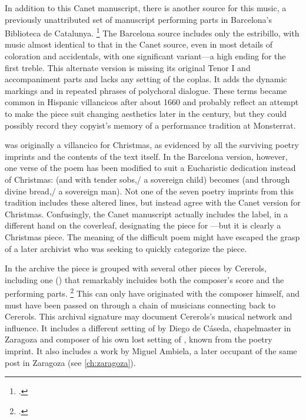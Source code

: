 In addition to this Canet manuscript, there is another source for this music, a
previously unattributed set of manuscript performing parts in Barcelona's
Biblioteca de Catalunya.%
    \footnote{.}
The Barcelona source includes only the estribillo, with music almost identical
to that in the Canet source, even in most details of coloration and accidentals,
with one significant variant---a  high ending for the first treble.
This alternate version is missing its original Tenor I and accompaniment parts
and lacks any setting of the coplas.
It adds the dynamic markings  and  in repeated phrases
of polychoral dialogue. 
These terms became common in Hispanic villancicos after about 1660 and probably
reflect an attempt to make the piece suit changing aesthetics later in the
century, but they could possibly record they copyist's memory of a performance
tradition at Monsterrat.

 was originally a villancico for Christmas, as
evidenced by all the surviving poetry imprints and the contents of the text
itself.
In the Barcelona version, however, one verse of the poem has been modified to
suit a Eucharistic dedication instead of Christmas:  (and with tender sobs,/ a sovereign child) becomes
 (and through divine bread,/
a sovereign man).
Not one of the seven poetry imprints from this tradition includes these altered
lines, but instead agree with the Canet version for Christmas.
Confusingly, the Canet manuscript actually includes the label, in a different
hand on the coverleaf, designating the piece for ---but it is clearly a Christmas piece.
The meaning of the difficult poem might have escaped the grasp of a later
archivist who was seeking to quickly categorize the piece.

In the archive the piece is grouped with several other pieces by Cererols,
including one () that remarkably incluides
both the composer's score and the performing parts.%
    \footnote{.}
This can only have originated with the composer himself, and must have been
passed on through a chain of musicians connecting back to Cererols.
This archival signature may document Cererols's musical network and influence.
It includes a different setting of  by Diego
de Cáseda, chapelmaster in Zaragoza and composer of his own lost setting of
, known from the poetry imprint.
It also includes a work by Miguel Ambiela, a later occupant of the same post in
Zaragoza (see \cref{ch:zaragoza}).

